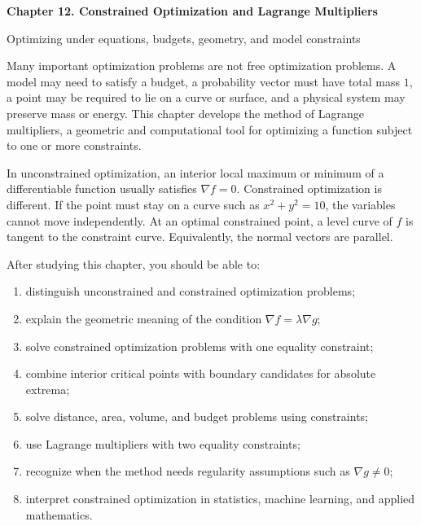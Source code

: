 \documentclass[11pt]{article}
\newcommand{\grad}{\nabla}
\begin{document}
\begin{center}
  {\LARGE\bfseries Chapter 12. Constrained Optimization and Lagrange Multipliers\par}
  \vspace{0.3em}
  {\large Optimizing under equations, budgets, geometry, and model constraints\par}
\end{center}

\begin{chapteroverviewbox}
Many important optimization problems are not free optimization problems. A model may need to satisfy a budget, a probability vector must have total mass $1$, a point may be required to lie on a curve or surface, and a physical system may preserve mass or energy. This chapter develops the method of Lagrange multipliers, a geometric and computational tool for optimizing a function subject to one or more constraints.

In unconstrained optimization, an interior local maximum or minimum of a differentiable function usually satisfies $\grad f=0$. Constrained optimization is different. If the point must stay on a curve such as $x^2+y^2=10$, the variables cannot move independently. At an optimal constrained point, a level curve of $f$ is tangent to the constraint curve. Equivalently, the normal vectors are parallel.
\end{chapteroverviewbox}

\begin{goalbox}
After studying this chapter, you should be able to:
\begin{enumerate}
  \item distinguish unconstrained and constrained optimization problems;
  \item explain the geometric meaning of the condition $\grad f=\lambda \grad g$;
  \item solve constrained optimization problems with one equality constraint;
  \item combine interior critical points with boundary candidates for absolute extrema;
  \item solve distance, area, volume, and budget problems using constraints;
  \item use Lagrange multipliers with two equality constraints;
  \item recognize when the method needs regularity assumptions such as $\grad g\ne 0$;
  \item interpret constrained optimization in statistics, machine learning, and applied mathematics.
\end{enumerate}
\end{goalbox}
\end{document}
